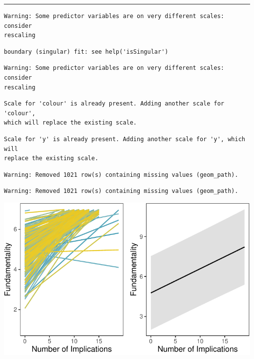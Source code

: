 \documentclass[
  .7em,
  letterpaper,
  DIV=11,
  numbers=noendperiod]{scrartcl}
\begin{document}
\begin{center}\rule{0.5\linewidth}{0.5pt}\end{center}

\begin{verbatim}
Warning: Some predictor variables are on very different scales: consider
rescaling
\end{verbatim}

\begin{verbatim}
boundary (singular) fit: see help('isSingular')
\end{verbatim}

\begin{verbatim}
Warning: Some predictor variables are on very different scales: consider
rescaling
\end{verbatim}

\begin{verbatim}
Scale for 'colour' is already present. Adding another scale for 'colour',
which will replace the existing scale.
\end{verbatim}

\begin{verbatim}
Scale for 'y' is already present. Adding another scale for 'y', which will
replace the existing scale.
\end{verbatim}

\begin{verbatim}
Warning: Removed 1021 row(s) containing missing values (geom_path).
\end{verbatim}

\begin{verbatim}
Warning: Removed 1021 row(s) containing missing values (geom_path).
\end{verbatim}

\includegraphics{EpMemNet_LabPres_htmldoc_files/figure-pdf/unnamed-chunk-23-1.pdf}
\end{document}
